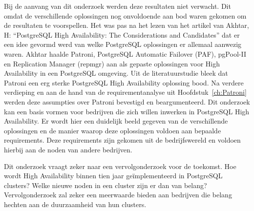 Bij de aanvang van dit onderzoek werden deze resultaten niet verwacht. Dit omdat de verschillende oplossingen nog onvoldoende aan bod waren gekomen om de resultaten te voorspellen. Het was pas na het lezen van het artikel van Akhtar, H: “PostgreSQL High Availability: The Considerations and Candidates” dat er een idee gevormd werd van welke PostgreSQL oplossingen er allemaal aanwezig waren. Akhtar haalde Patroni, PostgreSQL Automatic Failover (PAF), pgPool-II en Replication Manager (repmgr) aan als gepaste oplossingen voor High Availability in een PostgreSQL omgeving. Uit de literatuurstudie bleek dat Patroni een erg sterke PostgreSQL High Availability oplossing bood. Na verdere verdieping en aan de hand van de requirementanalyse uit Hoofdstuk~\ref{ch:Patroni}  werden deze assumpties over Patroni bevestigd en beargumenteerd. 
Dit onderzoek kan een basis vormen voor bedrijven die zich willen inwerken in PostgreSQL High Availability. Er wordt hier een duidelijk beeld gegeven van de verschillende oplossingen en de manier waarop deze oplossingen voldoen aan bepaalde requirements. Deze requirements zijn gekomen uit de bedrijfswereld en voldoen hierbij aan de noden van andere bedrijven. 

Dit onderzoek vraagt zeker naar een vervolgonderzoek voor de toekomst. Hoe wordt High Availability binnen tien jaar geïmplementeerd in PostgreSQL clusters? Welke nieuwe noden in een cluster zijn er dan van belang?
Vervolgonderzoek zal zeker een meerwaarde bieden aan bedrijven die belang hechten aan de duurzaamheid van hun clusters.






